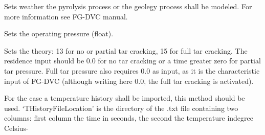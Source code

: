 \documentclass[letterpaper,10pt,english]{sphinxmanual}
\begin{document}
\begin{fulllineitems}

\begin{fulllineitems}
\label{FGDVCClasses:FGDVC_Fit_lin_regr.SetterAndLauncher.set4RunID}
Sets weather the pyrolysis process or the geolegy process shall be modeled. For more information see FG-DVC manual.

\end{fulllineitems}


\begin{fulllineitems}
\label{FGDVCClasses:FGDVC_Fit_lin_regr.SetterAndLauncher.set5Pressure}
Sets the operating pressure (float).

\end{fulllineitems}


\begin{fulllineitems}
\label{FGDVCClasses:FGDVC_Fit_lin_regr.SetterAndLauncher.set6Theorie}
Sets the theory: 13 for no or partial tar cracking, 15 for full tar cracking. The residence input should be 0.0 for no tar cracking or a time greater zero for partial tar pressure. Full tar pressure also requires 0.0 as input, as it is the characteristic input of FG-DVC (although writing here 0.0, the full tar cracking is activated).

\end{fulllineitems}


\begin{fulllineitems}
\label{FGDVCClasses:FGDVC_Fit_lin_regr.SetterAndLauncher.set7File}
For the case a temperature history shall be imported, this method should be used. `THistoryFileLocation' is the directory of the .txt file containing two columns: first column the time in seconds, the second the temperature indegree Celsius-

\end{fulllineitems}


\end{fulllineitems}
\end{document}
